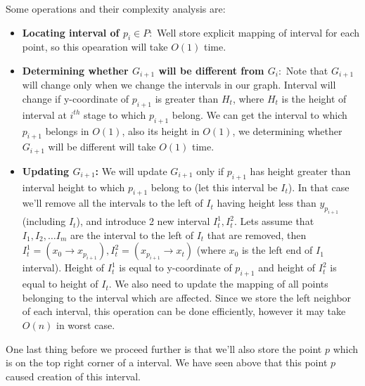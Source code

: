 \documentclass[a4paper]{article}
\begin{document}
Some operations and their complexity analysis are:
\begin{itemize}
	\item \textbf{Locating interval of $p_i \in P: $} Well store explicit mapping of interval for each point, so this opearation will take $O(1)$ time.
	\item \textbf{Determining whether $G_{i+1}$ will be different from $G_i: $} Note that $G_{i+1}$ will change only when we change the intervals in our graph. Interval will change if y-coordinate of $p_{i+1}$  is greater than $H_{t}$, where $H_{t}$ is the height of interval at $i^{th}$ stage to which $p_{i+1}$ belong. We can get the interval to which $p_{i+1}$ belongs in $O(1)$, also its height in $O(1)$, we determining whether $G_{i+1}$ will be different will take $O(1)$ time.
	\item \textbf{Updating $G_{i+1}$: } We will update $G_{i+1}$ only if $p_{i+1}$ has height greater than interval height to which $p_{i+1}$ belong to (let this interval be $I_t$). In that case we'll remove all the intervals to the left of $I_t$ having height less than $y_{p_{i+1}}$ (including $I_t$), and introduce 2 new interval $I^1_t, I^2_t$. Lets assume that $I_1, I_2, \ldots I_m$ are the interval to the left of $I_t$ that are removed, then $I^1_t  = (x_{0} \rightarrow x_{p_{i+1}}), I^2_t = (x_{p_{i+1}} \rightarrow x_t)$ (where $x_0$ is the left end of $I_1$ interval). Height of $I^1_t$ is equal to y-coordinate of $p_{i+1}$ and height of $I^2_t$ is equal to height of $I_t$. We also need to update the mapping of all points belonging to the interval which are affected. Since we store the left neighbor of each interval, this operation can be done efficiently, however it may take $O(n)$ in worst case. 

\end{itemize}
One last thing before we proceed further is that we'll also store the point $p$ which is on the top right corner of a interval. We have seen above that this point $p$ caused creation of this interval.
\end{document}
